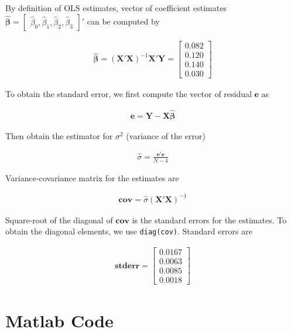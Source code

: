 \documentclass[11pt,letter]{article}
\newcommand{\vect}[1]{\boldsymbol{\mathbf{#1}}}
\newcounter{lem}[section] \setcounter{lem}{0}
\newcommand{\prn}[1]{\left({#1}\right)}
\newcommand{\bmat}[1]{\begin{bmatrix} #1 \end{bmatrix}}%
\newcommand{\code}[1]{\texttt{#1}}
\begin{document}
By definition of OLS estimates, vector of coefficient estimates $\hat{\vect{\beta}}=\bmat{\hat{\beta}_0,\hat{\beta}_1,\hat{\beta}_2,\hat{\beta}_3}'$ can be computed by

\begin{align*}
\hat{\vect{\beta}} =\prn{\vect{X}'\vect{X}}^{-1}\vect{X}'\vect{Y} = \left[\begin{array}{r} 0.082\\ 0.120\\ 0.140\\ 0.030 \end{array}\right]
\end{align*}

To obtain the standard error, we first compute the vector of residual $\vect{e}$ as

\begin{align*}
\vect{e} = \vect{Y} - \vect{X}\hat{\vect{\beta}} 
\end{align*}

Then obtain the estimator for $\sigma^2$ (variance of the error)

\begin{align*}
\hat{\sigma} = \frac{\vect{e}'\vect{e}}{N-4}
\end{align*}

Variance-covariance matrix for the estimates are 


\begin{align*}
\vect{cov} = \hat{\sigma} (\vect{X}'\vect{X})^{-1}
\end{align*}

Square-root of the diagonal of $\vect{cov}$ is the standard errors for the estimates. To obtain the diagonal elements, we use \code{diag(cov)}. Standard errors are

\begin{align*}
\vect{stderr} = \left[\begin{array}{c} 0.0167\\ 0.0063\\ 0.0085\\ 0.0018 \end{array}\right]
\end{align*}


\section*{Matlab Code}

\end{document}
